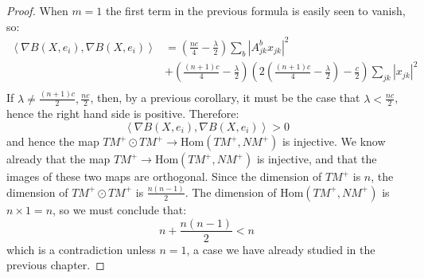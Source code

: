 \documentclass[11pt]{amsart}
\def \la { \left\langle }
\def \ra { \right\rangle }
\def \Hom{ \text{Hom} }
\def \TMp{ TM^{+} }
\def \NMp{ NM^+ }
\theoremstyle{definition}
\begin{document}
\begin{proof} When $m=1$ the first term in the previous formula is easily seen to vanish, so:
%
\begin{align*}
\la \nabla B (X, e_i), \nabla B(X, e_i) \ra &= \left( \frac{nc}{4} - \frac{\lambda}{2} \right) \sum_{b} \left| A^b_{jk} x_{jk} \right|^2 \\
&+ \left( \frac{(n+1)c}{4} - \frac{\lambda}{2} \right) \left( 2 \left( \frac{(n+1)c}{4} - \frac{\lambda}{2} \right) - \frac{c}{2} \right) \sum_{jk} \left| x_{jk} \right|^2 \\
\end{align*}
If $\lambda \neq \frac{(n+1)c}{2}, \frac{nc}{2}$, then, by a previous corollary, it must be the case that $\lambda < \frac{nc}{2}$, hence the right hand side is positive.  Therefore:
%
$$ \la \nabla B (X, e_i), \nabla B(X, e_i) \ra > 0 $$
%
and hence the map $\TMp \odot \TMp \rightarrow \Hom( \TMp, \NMp )$ is injective.  We know already that the map $TM^{+} \rightarrow \Hom( TM^{+}, NM^{+} )$ is injective, and that the images of these two maps are orthogonal.  Since the dimension of $TM^{+}$ is $n$, the dimension of $\TMp \odot \TMp$ is $\frac{n(n-1)}{2}$.  The dimension of $ \Hom ( \TMp, \NMp ) $ is $ n \times 1 = n$, so we must conclude that:
%
$$ n + \frac{n(n-1)}{2} < n $$
%
which is a contradiction unless $n=1$, a case we have already studied in the previous chapter.
\end{proof}
\end{document}
